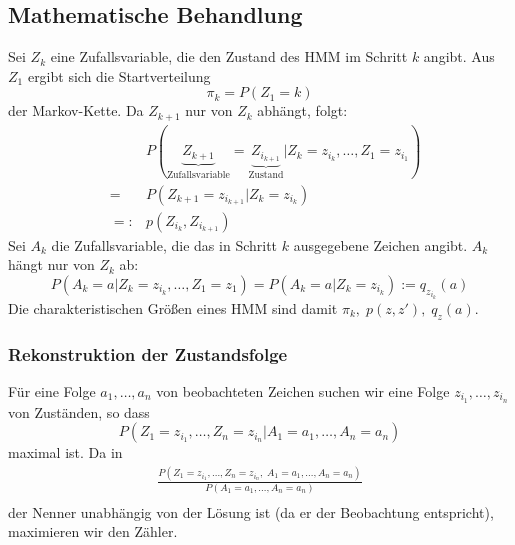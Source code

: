 \subsection{Mathematische Behandlung}
Sei \(Z_k\) eine Zufallsvariable, die den Zustand des HMM im Schritt \(k\) angibt.
Aus \(Z_1\) ergibt sich die Startverteilung \[\pi_k=P(Z_1=k)\] der Markov-Kette.
Da \(Z_{k+1}\) nur von \(Z_k\) abhängt, folgt:
\begin{eqnarray*}
	&&P(\underbrace{Z_{k+1}}_{\text{Zufallsvariable}}=\underbrace{Z_{i_{k+1}}}_{\text{Zustand}} | Z_k =z_{i_k}, \ldots, Z_1=z_{i_1})\\
	&=& P(Z_{k+1} = z_{i_{k+1}}|Z_k=z_{i_k})\\
	&=:& p(Z_{i_k},Z_{i_{k+1}})
\end{eqnarray*}
Sei \(A_k\) die Zufallsvariable, die das in Schritt \(k\) ausgegebene Zeichen angibt.
\(A_k\) hängt nur von \(Z_k\) ab:
\[P(A_k=a|Z_k=z_{i_k}, \ldots, Z_1=z_1) = P(A_k=a|Z_k=z_{i_k}) := q_{z_{i_k}}(a)\]
Die charakteristischen Größen eines HMM sind damit \(\pi_k,\; p(z,z'),\; q_z(a)\).

\subsubsection{Rekonstruktion der Zustandsfolge}
Für eine Folge \(a_1,\dots,a_n\) von beobachteten Zeichen suchen wir eine Folge \(z_{i_1}, \ldots, z_{i_n}\) von Zuständen, so dass
\[P(Z_1=z_{i_1}, \ldots, Z_n=z_{i_n} | A_1=a_1, \ldots, A_n=a_n)\]
maximal ist.
Da in
\begin{eqnarray*}
    \frac{P(Z_1=z_{i_1}, \dots, Z_n=z_{i_n},\; A_1 = a_1, \dots, A_n=a_n)}{P(A_1=a_1, \dots, A_n=a_n)} \\
\end{eqnarray*}
der Nenner unabhängig von der Lösung ist (da er der Beobachtung entspricht), maximieren wir den Zähler.

